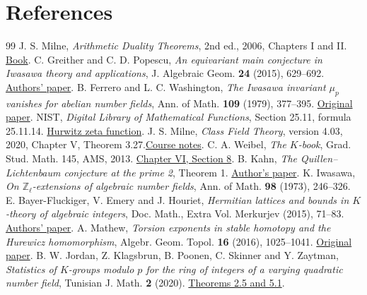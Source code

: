 \documentclass[a4paper,11pt]{article}
\theoremstyle{definition}
\theoremstyle{remark}
\newcommand{\ZZ}{\mathbb Z}\newcommand{\ord}{\operatorname{ord}}
\numberwithin{equation}{section}
\begin{document}
\section{References}\label{nav:bibliography-II}
\begingroup{}\begin{thebibliography}{99}\small
{} J. S. Milne, \emph{Arithmetic Duality Theorems}, 2nd ed., 2006, Chapters I and II. \href{https://www.jmilne.org/math/Books/ADTnot.pdf}{Book}.
 C. Greither and C. D. Popescu, \emph{An equivariant main conjecture in Iwasawa theory and applications}, J. Algebraic Geom. \textbf{24} (2015), 629--692. \href{https://arxiv.org/abs/1103.3069}{Authors' paper}.
 B. Ferrero and L. C. Washington, \emph{The Iwasawa invariant \(\mu_p\) vanishes for abelian number fields}, Ann. of Math. \textbf{109} (1979), 377--395. \href{https://doi.org/10.2307/1971116}{Original paper}.
 NIST, \emph{Digital Library of Mathematical Functions}, Section 25.11, formula 25.11.14. \href{https://dlmf.nist.gov/25.11}{Hurwitz zeta function}.
 J. S. Milne, \emph{Class Field Theory}, version 4.03, 2020, Chapter V, Theorem 3.27.\enspace\href{https://www.jmilne.org/math/CourseNotes/CFT.pdf}{Course notes}.
 C. A. Weibel, \emph{The \(K\)-book}, Grad. Stud. Math. 145, AMS, 2013. \href{https://sites.math.rutgers.edu/~weibel/Kbook/Kbook.VI.pdf}{Chapter VI, Section 8}.
 B. Kahn, \emph{The Quillen--Lichtenbaum conjecture at the prime 2}, Theorem 1. \href{https://webusers.imj-prg.fr/~bruno.kahn/preprints/QL2.pdf}{Author's paper}.
 K. Iwasawa, \emph{On \(\ZZ_\ell\)-extensions of algebraic number fields}, Ann. of Math. \textbf{98} (1973), 246--326.
 E. Bayer-Fluckiger, V. Emery and J. Houriet, \emph{Hermitian lattices and bounds in \(K\)-theory of algebraic integers}, Doc. Math., Extra Vol. Merkurjev (2015), 71--83. \href{https://arxiv.org/abs/1406.5953}{Authors' paper}.
 A. Mathew, \emph{Torsion exponents in stable homotopy and the Hurewicz homomorphism}, Algebr. Geom. Topol. \textbf{16} (2016), 1025--1041. \href{https://msp.org/agt/2016/16-2/agt-v16-n2-p12-s.pdf}{Original paper}.
 B. W. Jordan, Z. Klagsbrun, B. Poonen, C. Skinner and Y. Zaytman, \emph{Statistics of \(K\)-groups modulo \(p\) for the ring of integers of a varying quadratic number field}, Tunisian J. Math. \textbf{2} (2020). \href{https://msp.org/tunis/2020/2-2/tunis-v2-n2-p02-p.pdf}{Theorems 2.5 and 5.1}.

\end{thebibliography}
\end{document}
